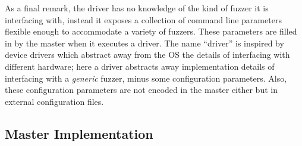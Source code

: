 As a final remark, the driver has no knowledge of the kind of fuzzer it is
interfacing with, instead it exposes a collection of command line parameters
flexible enough to accommodate a variety of fuzzers. These parameters are filled
in by the master when it executes a driver. The name ``driver'' is inspired by
device drivers which abstract away from the \ac{OS} the details of interfacing
with different hardware; here a driver abstracts away implementation details of
interfacing with a \emph{generic} fuzzer, minus some configuration parameters.
Also, these configuration parameters are not encoded in the master either but in
external configuration files.

\subsection{Master Implementation}
\label{sec:master-impl}

